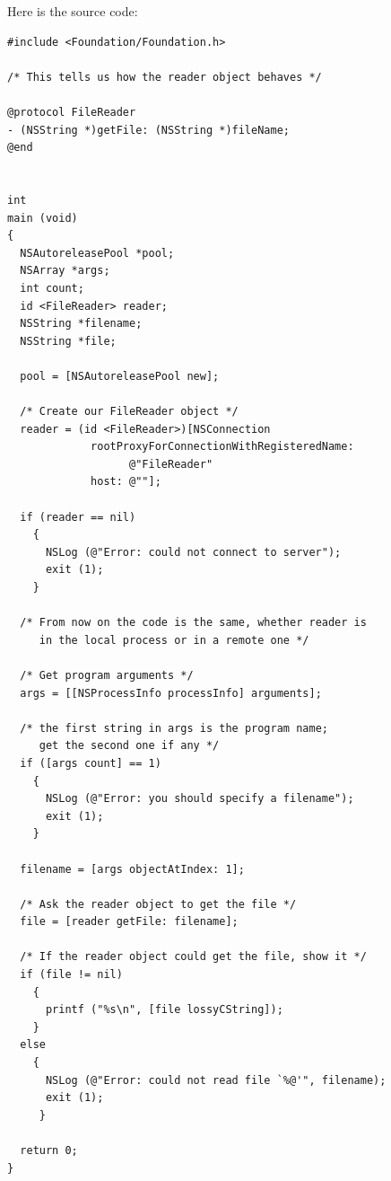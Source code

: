 \documentclass[a4paper]{article}
\begin{document}
Here is the source code:
\begin{verbatim}
#include <Foundation/Foundation.h>

/* This tells us how the reader object behaves */

@protocol FileReader
- (NSString *)getFile: (NSString *)fileName;
@end


int 
main (void)
{
  NSAutoreleasePool *pool;
  NSArray *args;
  int count;
  id <FileReader> reader;
  NSString *filename;
  NSString *file;

  pool = [NSAutoreleasePool new];

  /* Create our FileReader object */
  reader = (id <FileReader>)[NSConnection
             rootProxyForConnectionWithRegisteredName: 
                   @"FileReader" 
             host: @""];

  if (reader == nil)
    {
      NSLog (@"Error: could not connect to server");
      exit (1);
    }
  
  /* From now on the code is the same, whether reader is 
     in the local process or in a remote one */

  /* Get program arguments */
  args = [[NSProcessInfo processInfo] arguments];

  /* the first string in args is the program name; 
     get the second one if any */
  if ([args count] == 1)
    {
      NSLog (@"Error: you should specify a filename");
      exit (1);
    }
  
  filename = [args objectAtIndex: 1];

  /* Ask the reader object to get the file */
  file = [reader getFile: filename];

  /* If the reader object could get the file, show it */
  if (file != nil)
    {
      printf ("%s\n", [file lossyCString]);
    }
  else
    {
      NSLog (@"Error: could not read file `%@'", filename);
      exit (1);
     }

  return 0;
}
\end{verbatim}
\end{document}
